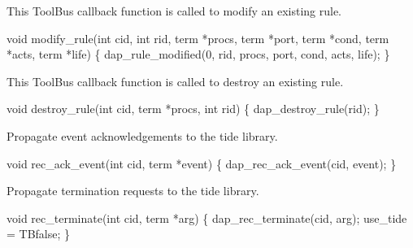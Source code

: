 
This ToolBus callback function is called to modify an existing rule. 

\nwenddocs{}\endmoddef\let\nwnotused=\nwoutput{}
void modify_rule(int cid, int rid, term *procs, term *port, 
                                term *cond, term *acts, term *life)
\{
  dap_rule_modified(0, rid, procs, port, cond, acts, life);
\}
\nwendcode{}\nwdocspar


This ToolBus callback function is called to destroy an existing rule.

\nwenddocs{}\endmoddef\let\nwnotused=\nwoutput{}
void destroy_rule(int cid, term *procs, int rid)
\{
  dap_destroy_rule(rid);
\}
\nwendcode{}\nwdocspar



Propagate event acknowledgements to the tide library.

\nwenddocs{}\endmoddef\let\nwnotused=\nwoutput{}
void rec_ack_event(int cid, term *event)
\{
  dap_rec_ack_event(cid, event);
\}
\nwendcode{}\nwdocspar


Propagate termination requests to the tide library.

\nwenddocs{}\endmoddef\let\nwnotused=\nwoutput{}
void rec_terminate(int cid, term *arg)
\{
  dap_rec_terminate(cid, arg);
  use_tide = TBfalse;
\}
\nwendcode{}

